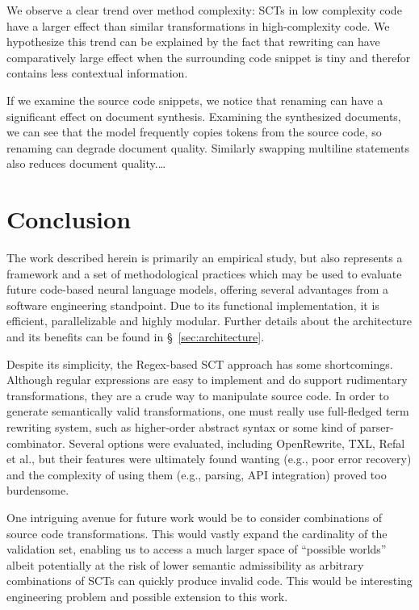 \documentclass[sigconf,review,anonymous]{acmart}
\begin{document}
  We observe a clear trend over method complexity: SCTs in low complexity code have a larger effect than similar transformations in high-complexity code. We hypothesize this trend can be explained by the fact that rewriting can have comparatively large effect when the surrounding code snippet is tiny and therefor contains less contextual information.

  If we examine the source code snippets, we notice that renaming can have a significant effect on document synthesis. Examining the synthesized documents, we can see that the model frequently copies tokens from the source code, so renaming can degrade document quality. Similarly swapping multiline statements also reduces document quality.\ldots

  \section{Conclusion}\label{sec:conclusion}

  The work described herein is primarily an empirical study, but also represents a framework and a set of methodological practices which may be used to evaluate future code-based neural language models, offering several advantages from a software engineering standpoint. Due to its functional implementation, it is efficient, parallelizable and highly modular. Further details about the architecture and its benefits can be found in \S~\ref{sec:architecture}.

  Despite its simplicity, the Regex-based SCT approach has some shortcomings. Although regular expressions are easy to implement and do support rudimentary transformations, they are a crude way to manipulate source code. In order to generate semantically valid transformations, one must really use full-fledged term rewriting system, such as higher-order abstract syntax or some kind of parser-combinator. Several options were evaluated, including OpenRewrite, TXL, Refal et al., but their features were ultimately found wanting (e.g., poor error recovery) and the complexity of using them (e.g., parsing, API integration) proved too burdensome.

   One intriguing avenue for future work would be to consider combinations of source code transformations. This would vastly expand the cardinality of the validation set, enabling us to access a much larger space of ``possible worlds'' albeit potentially at the risk of lower semantic admissibility as arbitrary combinations of SCTs can quickly produce invalid code. This would be interesting engineering problem and possible extension to this work.
\end{document}
